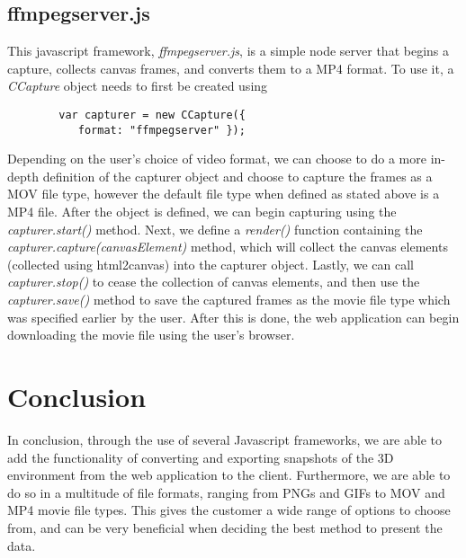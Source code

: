 \documentclass[letterpaper,10pt,titlepage, onecolumn, draftclsnofoot]{IEEEtran}
\begin{document}
\subsection{ffmpegserver.js}
This javascript framework, \textit{ffmpegserver.js\cite{ffmpegserver.js}}, is a simple node server that begins a capture, collects canvas frames, and converts them to a MP4 format. To use it, a \textit{CCapture} object needs to first be created using
\begin{lstlisting}
        var capturer = new CCapture({ 
           format: "ffmpegserver" });
\end{lstlisting}
Depending on the user’s choice of video format, we can choose to do a more in-depth definition of the capturer object and choose to capture the frames as a MOV file type, however the default file type when defined as stated above is a MP4 file. After the object is defined, we can begin capturing using the \textit{capturer.start()} method. Next, we define a \textit{render()} function containing the \textit{capturer.capture(canvasElement)} method, which will collect the canvas elements (collected using html2canvas) into the capturer object. Lastly, we can call \textit{capturer.stop()} to cease the collection of canvas elements, and then use the \textit{capturer.save()} method to save the captured frames as the movie file type which was specified earlier by the user. After this is done, the web application can begin downloading the movie file using the user’s browser.

\section{Conclusion}
In conclusion, through the use of several Javascript frameworks, we are able to add the functionality of converting and exporting snapshots of the 3D environment from the web application to the client. Furthermore, we are able to do so in a multitude of file formats, ranging from PNGs and GIFs to MOV and MP4 movie file types. This gives the customer a wide range of options to choose from, and can be very beneficial when deciding the best method to present the data.  

\newpage  



\end{document}
